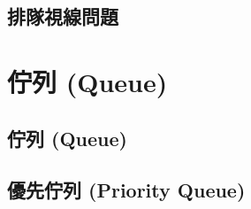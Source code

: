 \documentclass[12pt,a4paper,oneside]{report}
\begin{document}
\begin{CJK}{UTF8}{bkai}
\subsection{排隊視線問題}
\section{佇列 (Queue)}
\subsection{佇列 (Queue)}
\subsection{優先佇列 (Priority Queue)}

\ifx \allfiles \undefined

\printindex[noun]
\clearpage

\end{CJK}
\end{document}

